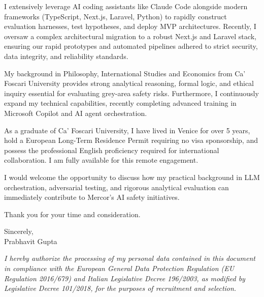 \documentclass[a4paper,10pt]{article}
\begin{document}
I extensively leverage AI coding assistants like Claude Code alongside modern frameworks (TypeScript, Next.js, Laravel, Python) to rapidly construct evaluation harnesses, test hypotheses, and deploy MVP architectures. Recently, I oversaw a complex architectural migration to a robust Next.js and Laravel stack, ensuring our rapid prototypes and automated pipelines adhered to strict security, data integrity, and reliability standards.

My background in Philosophy, International Studies and Economics from Ca' Foscari University provides strong analytical reasoning, formal logic, and ethical inquiry essential for evaluating grey-area safety risks. Furthermore, I continuously expand my technical capabilities, recently completing advanced training in Microsoft Copilot and AI agent orchestration.

As a graduate of Ca' Foscari University, I have lived in Venice for over 5 years, hold a European Long-Term Residence Permit requiring no visa sponsorship, and possess the professional English proficiency required for international collaboration. I am fully available for this remote engagement.

I would welcome the opportunity to discuss how my practical background in LLM orchestration, adversarial testing, and rigorous analytical evaluation can immediately contribute to Mercor's AI safety initiatives.

Thank you for your time and consideration.

Sincerely,\\[3pt]
Prabhavit Gupta

\vspace{3pt}
{\scriptsize\textit{I hereby authorize the processing of my personal data contained in this document in compliance with the European General Data Protection Regulation (EU Regulation 2016/679) and Italian Legislative Decree 196/2003, as modified by Legislative Decree 101/2018, for the purposes of recruitment and selection.}}
\end{document}
